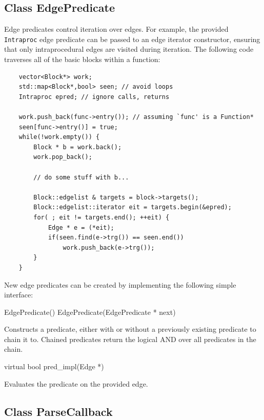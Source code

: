 \documentclass{article}
\newenvironment{apient}{\small\verbatim}{\endverbatim}
\newcommand{\apidesc}[1]{%
{\addtolength{\leftskip}{4em}%
#1\par\medskip}
}
\begin{document}
\subsection{Class EdgePredicate}
\label{sec:pred}

Edge predicates control iteration over edges. For example, the provided
\texttt{Intraproc} edge predicate can be passed to an edge iterator
constructor, ensuring that only intraprocedural edges are visited during
iteration. The following code traverses all of the basic blocks within a
function:

\lstset{numbers=left, numberstyle=\tiny, stepnumber=5, numbersep=5pt}
\begin{lstlisting}
    vector<Block*> work;
    std::map<Block*,bool> seen; // avoid loops
    Intraproc epred; // ignore calls, returns
   
    work.push_back(func->entry()); // assuming `func' is a Function*
    seen[func->entry()] = true;
    while(!work.empty()) {
        Block * b = work.back();
        work.pop_back();

        // do some stuff with b...
   
        Block::edgelist & targets = block->targets();
        Block::edgelist::iterator eit = targets.begin(&epred);
        for( ; eit != targets.end(); ++eit) {
            Edge * e = (*eit);
            if(seen.find(e->trg()) == seen.end())
                work.push_back(e->trg());
        }
    } 
\end{lstlisting}

New edge predicates can be created by implementing the following simple interface:

\begin{apient}
EdgePredicate()
EdgePredicate(EdgePredicate * next)
\end{apient}
\apidesc{Constructs a predicate, either with or without a previously existing predicate to chain it to. Chained predicates return the logical AND over all predicates in the chain.}

\begin{apient}
virtual bool pred_impl(Edge *)
\end{apient}
\apidesc{Evaluates the predicate on the provided edge.}

\subsection{Class ParseCallback}
\end{document}
